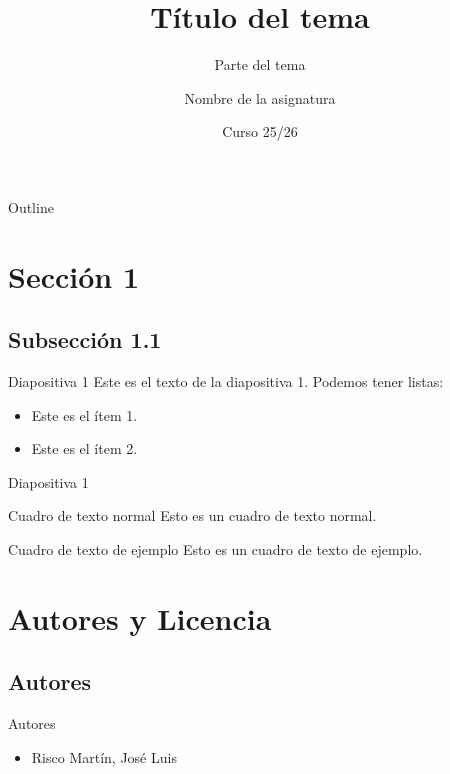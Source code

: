 \documentclass[8pt, t]{beamer}
\author{Nombre de la asignatura}
\date{Curso 25/26}
\title{Título del tema}
\subtitle{Parte del tema}
\begin{document}
\maketitle
\begin{frame}{Outline}
\tableofcontents
\end{frame}


\section{Sección 1}
\label{sec:org3bd3e29}

\subsection{Subsección 1.1}
\label{sec:org3996ee9}

\begin{frame}[label={sec:org75500d1}]{Diapositiva 1}
Este es el \alert{texto de la diapositiva 1}. Podemos tener listas:
\begin{itemize}
\item Este es el ítem 1.
\item Este es el ítem 2.
\end{itemize}
\end{frame}

\begin{frame}[label={sec:orgbb6f110}]{Diapositiva 1}
\begin{block}{Cuadro de texto normal}
Esto es un cuadro de texto normal.
\end{block}

\begin{exampleblock}{Cuadro de texto de ejemplo}
Esto es un cuadro de texto de ejemplo.
\end{exampleblock}
\end{frame}

\section{Autores y Licencia}
\label{sec:org64a5312}

\subsection{Autores}
\label{sec:orgc5e1ada}

\begin{frame}[label={sec:org6e6f3ba}]{Autores}
\begin{itemize}
\item Risco Martín, José Luis
\end{itemize}
\end{frame}
\end{document}
